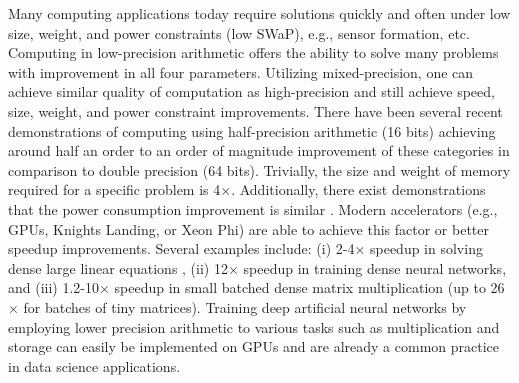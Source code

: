 \documentclass[review,onefignum,onetabnum]{siamart190516}
\begin{document}
Many computing applications today require solutions quickly and often under low size, weight, and power constraints (low SWaP), e.g., sensor formation, etc. 
Computing in low-precision arithmetic offers the ability to solve many problems with improvement in all four parameters.
Utilizing mixed-precision, one can achieve similar quality of computation as high-precision and still achieve 
speed, size, weight, and power constraint improvements. 
There have been several recent demonstrations of computing using half-precision arithmetic (16 bits) achieving around half an order to an 
order of magnitude improvement of these categories in comparison to double precision (64 bits).
Trivially, the size and weight of memory required for a specific problem is 4$\times$.
Additionally, there exist demonstrations that the power consumption improvement is similar
\cite{fagan2016powerwall}.
Modern accelerators (e.g., GPUs, Knights Landing, or Xeon Phi) are able to achieve this factor or better speedup improvements.
Several examples include:
(i)   2-4$\times$ speedup in solving dense large linear equations \cite{haidar2018iterative,haidar2019tensorcore},
(ii)  12$\times$ speedup in training dense neural networks,
and
(iii) 1.2-10$\times$ speedup in small batched dense matrix multiplication \cite{abdelfattah2019batched} (up to 26$\times$ for batches of tiny matrices).
Training deep artificial neural networks by employing lower precision arithmetic to various tasks such as multiplication \cite{Courbariaux2014Mult} and storage \cite{Courbariaux2014Storage} can easily be implemented on GPUs and are already a common practice in data science applications.\par
\end{document}
